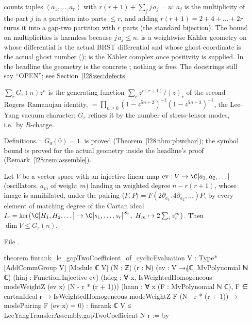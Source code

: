 \begin{dictionary}
 counts tuples $(a_1,\dots,a_r)$ with $r(r+1)+\sum_j j\,a_j=n$: $a_j$ is the multiplicity of the part $j$ in a partition
into parts $\le r$, and adding $r(r+1)=2+4+\dots+2r$ turns it into a gap-two partition with $r$ parts (the standard bijection). The bound
 on multiplicities is harmless because $j\,a_j\le n$.  is a weightwise Kähler geometry on
 whose differential is the actual BRST differential and whose ghost coordinate is the actual ghost number
();  is the Kähler complex once positivity  is supplied. In the headline the
geometry is the concrete ; nothing is free. The docstrings still say ``OPEN''; see Section~\ref{l28:sec:defects}.
\end{dictionary}

\begin{physics}
$\sum_rG_r(n)z^n$ is the generating function $\sum_rz^{r(r+1)}/(z)_r$ of the second Rogers--Ramanujan identity, $=\prod_{n\ge0}(1-z^{5n+2})^{-1}(1-z^{5n+3})^{-1}$,
the Lee--Yang vacuum character; $G_r$ refines it by the number of stress-tensor modes, i.e.\ by $R$-charge.
\end{physics}

\begin{status}
Definitions. : $G_0(0)=1$.  is proved (Theorem~\ref{l28:thm:pbwchar}); the
symbol bound is proved for the actual geometry inside the headline's proof (Remark~\ref{l28:rem:assemble}).
\end{status}

\begin{theorem}\label{l28:thm:cyclic}
Let $V$ be a vector space with an injective linear map $\mathrm{ev}:V\to\C[a_1,a_2,\dots]$ (oscillators, $a_m$ of weight $m$) landing in weighted
degree $n-r(r+1)$, whose image is annihilated, under the pairing $\langle F,P\rangle=F(2\partial_{a_1},4\partial_{a_2},\dots)P$, by every element of
matching degree of the Cartan ideal $I_r=\ker\bigl(\C[H_1,H_2,\dots]\to\C[s_1,\dots,s_r]^{S_r},\ H_m\mapsto2\sum_is_i^m\bigr)$. Then
$\dim V\le G_r(n)$.
\end{theorem}

\noindent File .
\begin{leancode}
theorem finrank_le_gapTwoCoefficient_of_cyclicEvaluation
    {V : Type*} [AddCommGroup V] [Module ℂ V] (N : ℤ) (r : ℕ)
    (ev : V →ₗ[ℂ] MvPolynomial ℕ ℂ) (hinj : Function.Injective ev)
    (hdeg : ∀ x, IsWeightedHomogeneous modeWeightZ (ev x) (N - r * (r + 1)))
    (hann : ∀ x (F : MvPolynomial ℕ ℂ), F ∈ cartanIdeal r →
      IsWeightedHomogeneous modeWeightZ F (N - r * (r + 1)) → modePairing F (ev x) = 0) :
    finrank ℂ V ≤ LeeYangTransferAssembly.gapTwoCoefficient N r := by
\end{leancode}

